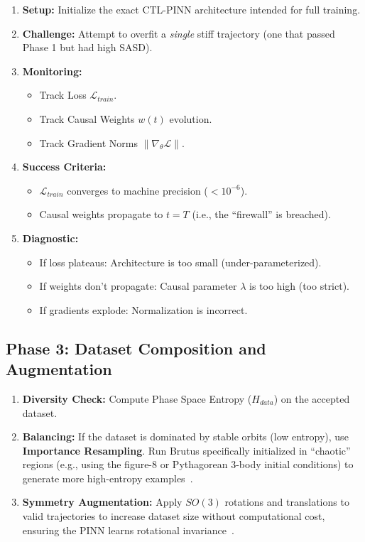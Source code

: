 \documentclass[11pt, a4paper]{article}
\newcommand{\norm}[1]{\left\lVert#1\right\rVert} %
\begin{document}
\begin{enumerate}
    \item \textbf{Setup:} Initialize the exact CTL-PINN architecture intended for full training.
    \item \textbf{Challenge:} Attempt to overfit a \textit{single} stiff trajectory (one that passed Phase 1 but had high SASD).
    \item \textbf{Monitoring:}
    \begin{itemize}
        \item Track Loss $\mathcal{L}_{train}$.
        \item Track Causal Weights $w(t)$ evolution.
        \item Track Gradient Norms $\norm{\nabla_\theta \mathcal{L}}$.
    \end{itemize}
    \item \textbf{Success Criteria:}
    \begin{itemize}
        \item $\mathcal{L}_{train}$ converges to machine precision ($< 10^{-6}$).
        \item Causal weights propagate to $t=T$ (i.e., the ``firewall'' is breached).
    \end{itemize}
    \item \textbf{Diagnostic:}
    \begin{itemize}
        \item If loss plateaus: Architecture is too small (under-parameterized).
        \item If weights don't propagate: Causal parameter $\lambda$ is too high (too strict).
        \item If gradients explode: Normalization is incorrect.
    \end{itemize}
\end{enumerate}

\subsection{Phase 3: Dataset Composition and Augmentation}

\begin{enumerate}
    \item \textbf{Diversity Check:} Compute Phase Space Entropy ($H_{data}$) on the accepted dataset.
    \item \textbf{Balancing:} If the dataset is dominated by stable orbits (low entropy), use \textbf{Importance Resampling}. Run Brutus specifically initialized in ``chaotic'' regions (e.g., using the figure-8 or Pythagorean 3-body initial conditions) to generate more high-entropy examples~\cite{ref31}.
    \item \textbf{Symmetry Augmentation:} Apply $SO(3)$ rotations and translations to valid trajectories to increase dataset size without computational cost, ensuring the PINN learns rotational invariance~\cite{ref6}.
\end{enumerate}
\end{document}
